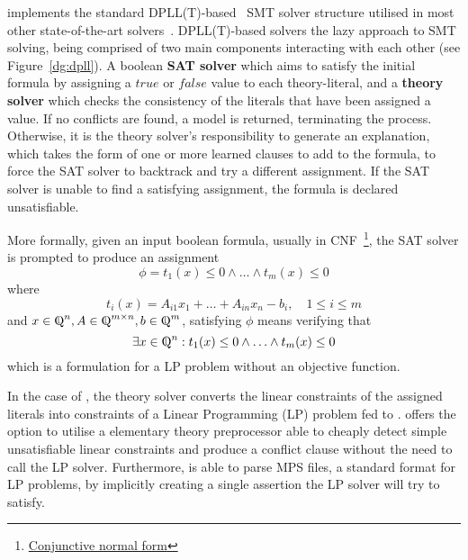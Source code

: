 \documentclass[runningheads]{llncs}
\begin{document}
\dlinear implements the standard DPLL(T)-based~\cite{ref:dpll-t} SMT solver structure utilised in most other state-of-the-art solvers~\cite{ref:z3-dpll-t}.
DPLL(T)-based solvers the lazy approach to SMT solving, being comprised of two main components interacting with each other (see Figure~\ref{dg:dpll}).
A boolean \textbf{SAT solver} which aims to satisfy the initial formula by assigning a $true$ or $false$ value to each theory-literal, and a \textbf{theory solver} which checks the consistency of the literals that have been assigned a value.
If no conflicts are found, a model is returned, terminating the process.
Otherwise, it is the theory solver's responsibility to generate an explanation, which takes the form of one or more learned clauses to add to the formula, to force the SAT solver to backtrack and try a different assignment.
If the SAT solver is unable to find a satisfying assignment, the formula is declared unsatisfiable.

More formally, given an input boolean formula, usually in CNF~\footnote{\href{https://en.wikipedia.org/wiki/Conjunctive_normal_form}{Conjunctive normal form}}, the SAT solver is prompted to produce an assignment
\begin{equation} %
    \label{eq:smt-formula}
    \phi = t_1(x) \le 0 \wedge \ldots \wedge t_m (x) \le 0
\end{equation}
where
\begin{equation*}
    t_i(x) = A_{i1}x_1 + \ldots + A_{in}x_n - b_i, \quad 1 \le i \le m
\end{equation*}
and $x \in \bbbq^n, A \in \bbbq^{m \times n}, b \in \bbbq^m$, satisfying $\phi$ means verifying that
\begin{equation*}
    \exists x \in \bbbq^n : t_1(x) \le 0 \wedge \ldots \wedge t_m(x) \le 0
\end{equation*}
which is a formulation for a LP problem without an objective function.

In the case of \dlinear, the theory solver converts the linear constraints of the assigned literals into constraints of a Linear Programming (LP) problem fed to \soplex.
\dlinear offers the option to utilise a elementary theory preprocessor able to cheaply detect simple unsatisfiable linear constraints and produce a conflict clause without the need to call the LP solver.
Furthermore, \dlinear is able to parse MPS files, a standard format for LP problems, by implicitly creating a single assertion the LP solver will try to satisfy.
\end{document}
